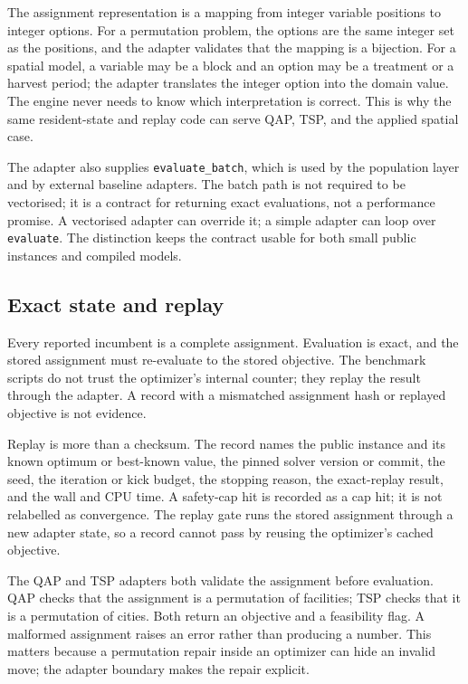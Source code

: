 \documentclass[pdflatex,sn-mathphys-num]{sn-jnl}
\begin{document}
The assignment representation is a mapping from integer variable positions to integer options. For a
permutation problem, the options are the same integer set as the positions, and the adapter validates
that the mapping is a bijection. For a spatial model, a variable may be a block and an option may be
a treatment or a harvest period; the adapter translates the integer option into the domain value.
The engine never needs to know which interpretation is correct. This is why the same resident-state
and replay code can serve QAP, TSP, and the applied spatial case.

The adapter also supplies \texttt{evaluate\_batch}, which is used by the population layer and by
external baseline adapters. The batch path is not required to be vectorised; it is a contract for
returning exact evaluations, not a performance promise. A vectorised adapter can override it; a
simple adapter can loop over \texttt{evaluate}. The distinction keeps the contract usable for both
small public instances and compiled models.

\subsection{Exact state and replay}

Every reported incumbent is a complete assignment. Evaluation is exact, and the stored assignment must
re-evaluate to the stored objective. The benchmark scripts do not trust the optimizer's internal
counter; they replay the result through the adapter. A record with a mismatched assignment hash or
replayed objective is not evidence.

Replay is more than a checksum. The record names the public instance and its known optimum or
best-known value, the pinned solver version or commit, the seed, the iteration or kick budget, the
stopping reason, the exact-replay result, and the wall and CPU time. A safety-cap hit is recorded as a
cap hit; it is not relabelled as convergence. The replay gate runs the stored assignment through a
new adapter state, so a record cannot pass by reusing the optimizer's cached objective.

The QAP and TSP adapters both validate the assignment before evaluation. QAP checks that the
assignment is a permutation of facilities; TSP checks that it is a permutation of cities. Both return
an objective and a feasibility flag. A malformed assignment raises an error rather than producing a
number. This matters because a permutation repair inside an optimizer can hide an invalid move; the
adapter boundary makes the repair explicit.
\end{document}

